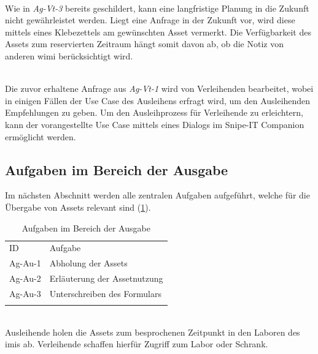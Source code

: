         {\sffamily\color{maincolor}{Ag-Vt-3 | Reservierung der Assets}}\\
Wie in \textit{Ag-Vt-3} bereits geschildert, kann eine langfristige Planung in
die Zukunft nicht gewährleistet werden. Liegt eine Anfrage in der Zukunft vor,
wird diese mittels eines Klebezettels am gewünschten Asset vermerkt. Die
Verfügbarkeit des Assets zum reservierten Zeitraum hängt somit davon ab, ob die
Notiz von anderen \ac{wimi} berücksichtigt wird.

        {\sffamily\color{maincolor}{Ag-Vt-4 | Beratung der Ausleihenden}}\\
Die zuvor erhaltene Anfrage aus \textit{Ag-Vt-1} wird von Verleihenden
bearbeitet, wobei in einigen Fällen der Use Case des Ausleihens erfragt wird, um
den Ausleihenden Empfehlungen zu geben. Um den Ausleihprozess für Verleihende zu
erleichtern, kann der vorangestellte Use Case mittels eines Dialogs im Snipe-IT
Companion ermöglicht werden.


\subsection{Aufgaben im Bereich der Ausgabe}
Im nächsten Abschnitt werden alle zentralen Aufgaben aufgeführt, welche für die
Übergabe von Assets relevant sind (\ref{table:Ag-Au}).

\begin{table}[h]
        \centering
        \caption{Aufgaben im Bereich der Ausgabe}
        \begin{tabular}{ll}
                \arrayrulecolor{maincolor}\hline
                \sffamily\color{maincolor}ID & \sffamily\color{maincolor}Aufgabe
                \\
                \arrayrulecolor{maincolor}\hline
                Ag-Au-1                      & Abholung der Assets
                \\
                Ag-Au-2                      & Erläuterung der Assetnutzung
                \\
                Ag-Au-3                      & Unterschreiben des Formulars
                \\
                \arrayrulecolor{maincolor}\hline
        \end{tabular}
        \label{table:Ag-Au}
\end{table}

{\sffamily\color{maincolor}{Ag-Au-1 | Abholung der Assets}}\\
Ausleihende holen die Assets zum besprochenen Zeitpunkt in den Laboren des
\ac{imis} ab. Verleihende schaffen hierfür Zugriff zum Labor oder Schrank.

